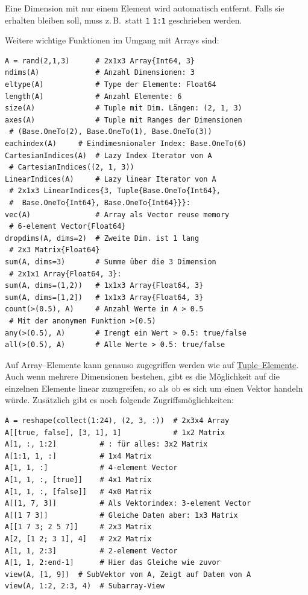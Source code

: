 \documentclass[10pt,twocolumn]{scrartcl}
\begin{document}
Eine Dimension mit nur einem Element wird automatisch entfernt. Falls sie
erhalten bleiben soll, muss z.\,B.\ statt \lstinline|1| \lstinline|1:1|
geschrieben werden.

Weitere wichtige Funktionen im Umgang mit Arrays sind:
\begin{lstlisting}
A = rand(2,1,3)      # 2x1x3 Array{Int64, 3}
ndims(A)             # Anzahl Dimensionen: 3
eltype(A)            # Type der Elemente: Float64
length(A)            # Anzahl Elemente: 6
size(A)              # Tuple mit Dim. Längen: (2, 1, 3)
axes(A)              # Tuple mit Ranges der Dimensionen
 # (Base.OneTo(2), Base.OneTo(1), Base.OneTo(3))
eachindex(A)     # Eindimesnionaler Index: Base.OneTo(6)
CartesianIndices(A)  # Lazy Index Iterator von A
 # CartesianIndices((2, 1, 3))
LinearIndices(A)     # Lazy linear Iterator von A
 # 2x1x3 LinearIndices{3, Tuple{Base.OneTo{Int64},
 #  Base.OneTo{Int64}, Base.OneTo{Int64}}}:
vec(A)               # Array als Vector reuse memory
 # 6-element Vector{Float64}
dropdims(A, dims=2)  # Zweite Dim. ist 1 lang
 # 2x3 Matrix{Float64}
sum(A, dims=3)       # Summe über die 3 Dimension
 # 2x1x1 Array{Float64, 3}:
sum(A, dims=(1,2))   # 1x1x3 Array{Float64, 3}
sum(A, dims=[1,2])   # 1x1x3 Array{Float64, 3}
count(>(0.5), A)     # Anzahl Werte in A > 0.5
 # Mit der anonymen Funktion >(0.5)
any(>(0.5), A)       # Irengt ein Wert > 0.5: true/false
all(>(0.5), A)       # Alle Werte > 0.5: true/false
\end{lstlisting}

Auf Array--Elemente kann genauso zugegriffen werden wie auf
\hyperref[ssec:tuple]{Tuple--Elemente}. Auch wenn mehrere Dimensionen bestehen,
gibt es die Möglichkeit auf die einzelnen Elemente linear zuzugreifen, so als ob
es sich um einen Vektor handeln würde. Zusätzlich gibt es noch folgende
Zugriffsmöglichkeiten:

\begin{lstlisting}
A = reshape(collect(1:24), (2, 3, :))  # 2x3x4 Array
A[[true, false], [3, 1], 1]            # 1x2 Matrix
A[1, :, 1:2]          # : für alles: 3x2 Matrix
A[1:1, 1, :]          # 1x4 Matrix
A[1, 1, :]            # 4-element Vector
A[1, 1, :, [true]]    # 4x1 Matrix
A[1, 1, :, [false]]   # 4x0 Matrix
A[[1, 7, 3]]          # Als Vektorindex: 3-element Vector
A[[1 7 3]]            # Gleiche Daten aber: 1x3 Matrix
A[[1 7 3; 2 5 7]]     # 2x3 Matrix
A[2, [1 2; 3 1], 4]   # 2x2 Matrix
A[1, 1, 2:3]          # 2-element Vector
A[1, 1, 2:end-1]      # Hier das Gleiche wie zuvor
view(A, [1, 9])  # SubVektor von A, Zeigt auf Daten von A
view(A, 1:2, 2:3, 4)  # Subarray-View
\end{lstlisting}
\end{document}
